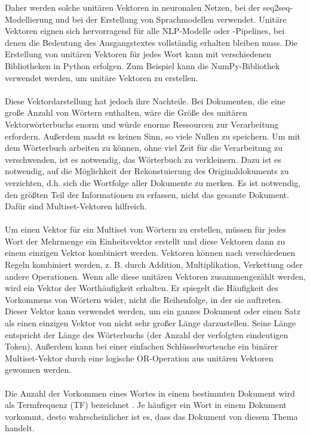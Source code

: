 Daher werden solche unitären Vektoren in neuronalen Netzen, bei der \ac{seq2seq}-Modellierung und bei der Erstellung von Sprachmodellen verwendet. 
Unitäre Vektoren eignen sich hervorragend für alle \ac{NLP}-Modelle oder -Pipelines, bei denen die Bedeutung des Ausgangstextes vollständig erhalten bleiben muss.
Die Erstellung von unitären Vektoren für jedes Wort kann mit verschiedenen Bibliotheken in Python erfolgen. 
Zum Beispiel kann die NumPy-Bibliothek verwendet werden, um unitäre Vektoren zu erstellen. \cite{numpy}\\\\
Diese Vektordarstellung hat jedoch ihre Nachteile. 
Bei Dokumenten, die eine große Anzahl von Wörtern enthalten, wäre die Größe des unitären Vektorwörterbuchs enorm und würde enorme Ressourcen zur Verarbeitung erfordern. 
Außerdem macht es keinen Sinn, so viele Nullen zu speichern. 
Um mit dem Wörterbuch arbeiten zu können, ohne viel Zeit für die Verarbeitung zu verschwenden, ist es notwendig, das Wörterbuch zu verkleinern. 
Dazu ist es notwendig, auf die Möglichkeit der Rekonstuierung des Originaldokuments zu verzichten, d.h. sich die Wortfolge aller Dokumente zu merken. 
Es ist notwendig, den größten Teil der Informationen zu erfassen, nicht das gesamte Dokument. Dafür sind Multiset-Vektoren hilfreich.\\\\
Um einen Vektor für ein Multiset von Wörtern zu erstellen, müssen für jedes Wort der Mehrmenge ein Einheitsvektor erstellt und diese Vektoren dann zu einem einzigen Vektor kombiniert werden. 
Vektoren können nach verschiedenen Regeln kombiniert werden, z. B. durch Addition, Multiplikation, Verkettung oder andere Operationen. 
Wenn alle diese unitären Vektoren zusammengezählt werden, wird ein Vektor der Worthäufigkeit erhalten. 
Er spiegelt die Häufigkeit des Vorkommens von Wörtern wider, nicht die Reihenfolge, in der sie auftreten. 
Dieser Vektor kann verwendet werden, um ein ganzes Dokument oder einen Satz als einen einzigen Vektor von nicht sehr großer Länge darzustellen. 
Seine Länge entspricht der Länge des Wörterbuchs (der Anzahl der verfolgten eindeutigen Token). 
Außerdem kann bei einer einfachen Schlüsselwortsuche ein binärer Multiset-Vektor durch eine logische OR-Operation aus unitären Vektoren gewonnen werden. \cite{bird_natural_2009}\\\\
Die Anzahl der Vorkommen eines Wortes in einem bestimmten Dokument wird als Termfrequenz (\ac{TF}) bezeichnet \cite{lane_natural_2019}. 
Je häufiger ein Wort in einem Dokument vorkommt, desto wahrscheinlicher ist es, dass das Dokument von diesem Thema handelt. 
